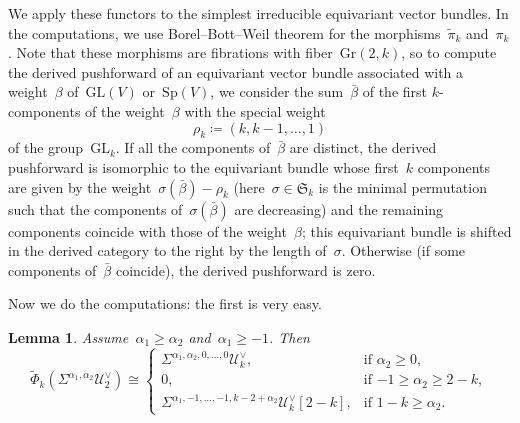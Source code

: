 \documentclass[a4paper]{article}
\newcommand{\Sp}{\mathrm{Sp}}
\newcommand{\Gr}{\mathrm{Gr}}
\newcommand{\GL}{\mathrm{GL}}
\newcommand{\cU}{\mathcal{U}}
\newtheorem{lemma}[theorem]{Lemma}
\theoremstyle{remark}
\theoremstyle{definition}
\begin{document}
We apply these functors to the simplest irreducible equivariant vector bundles.
In the computations, we use Borel--Bott--Weil theorem for the morphisms~\(\tilde\pi_k\) and~\(\pi_k\).
Note that these morphisms are fibrations with fiber~\(\Gr(2,k)\),
so to compute the derived pushforward of an equivariant vector bundle 
associated with a weight~\(\beta\) of~\(\GL(V)\) or~\(\Sp(V)\),
we consider the sum~\(\bar\beta\) of the first \(k\)-components of the weight~\(\beta\)
with the special weight
\begin{equation*}
\rho_k \coloneqq (k,k-1,\dots,1)
\end{equation*}
of the group~\(\GL_k\).
If all the components of~\(\bar\beta\) are distinct, 
the derived pushforward is isomorphic to the equivariant bundle whose first~\(k\) components 
are given by the weight~\(\sigma(\bar\beta) - \rho_k\)
(here~\(\sigma \in \mathfrak{S}_k\) is the minimal permutation such that the components of~\(\sigma(\bar\beta)\) are decreasing)
and the remaining components coincide with those of the weight~\(\beta\); 
this equivariant bundle is shifted in the derived category to the right by the length of~\(\sigma\).
Otherwise (if some components of~\(\bar\beta\) coincide), the derived pushforward is zero. 


Now we do the computations: the first is very easy.

\begin{lemma}
\label{lem:tphi-cu}
Assume~\(\alpha_1 \ge \alpha_2\) and~\(\alpha_1 \ge -1\).
Then
\begin{equation}
\label{eq:thpik-sigma}
\tilde\Phi_k(\Sigma^{\alpha_1,\alpha_2}\cU_2^\vee) \cong 
\begin{cases}
\Sigma^{\alpha_1,\alpha_2,0,\dots,0}\cU_k^\vee, & \text{if~\(\alpha_2 \ge 0\)},\\
0, & \text{if~\(-1 \ge \alpha_2 \ge 2 - k\)},\\
\Sigma^{\alpha_1,-1,\dots,-1,k-2+\alpha_2}\cU_k^\vee[2-k], & \text{if~\(1-k \ge \alpha_2\)}.
\end{cases}
\end{equation}
\end{lemma}
\end{document}
